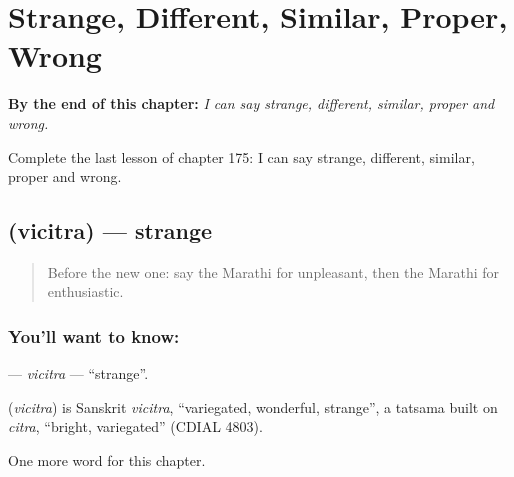 
\chapter{Strange, Different, Similar, Proper, Wrong}
\label{ch:mr-strange-different-similar-proper-wrong}

\begin{chapteropening}
\textbf{By the end of this chapter:} \emph{I can say strange, different, similar, proper and wrong.}

Complete the last lesson of chapter 175: I can say strange, different, similar, proper and wrong.
\end{chapteropening}

\section[\texorpdfstring{\mr{विचित्र} (vicitra)}{विचित्र (vicitra)}]{ (vicitra) — strange}

\label{lesson:MR-C175-vicitra}



\begin{quote}
Before the new one: say the Marathi for unpleasant, then the Marathi for enthusiastic.
\end{quote}

\subsection*{You'll want to know: }
\textbf{} — \emph{vicitra} — \textquotedblleft{}strange\textquotedblright{}.

\begin{cousinweb}
\textbf{} (\emph{vicitra}) is Sanskrit \emph{vicitra}, \textquotedblleft{}variegated, wonderful, strange\textquotedblright{}, a tatsama built on \emph{citra}, \textquotedblleft{}bright, variegated\textquotedblright{} (CDIAL 4803).
\end{cousinweb}

\begin{grammarlens}[title={What you've built}]
One more word for this chapter.
\end{grammarlens}

